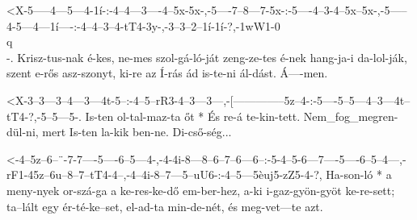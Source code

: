   {<X-5-----4---5---4-1í-:-4--4---3----4--5x-5x-,-5----7--8---7-5x-:-5----4--3-4--5x--5x-,-5-----4-5---4---1í----:-4--4--3--4-tT4-3y-,-3--3--2--1í-1í-?,-1wW1-0\\q\\-.}
  {   Krisz-tus-nak é-kes, ne-mes szol-gá-ló-ját  zeng-ze-tes é-nek  hang-ja-i da-lol-ják, szent e-rős asz-szonyt, ki-re az Í-rás ád   is-te-ni ál-dást. Á----men.}

  {<X-3--3---3--4---3---4t-5--:-4--5--rR3-4--3---3---,-[--------------5z--4-:-5----5--5---4--3---4t--tT4-?,-5--5---5-.}
  {   Is-ten ol-tal-maz-ta őt * És re-á   te-kin-tett. Nem_fog_megren-dül-ni, mert Is-ten la-kik ben-ne.    Di-cső-ség...}

  {<-4--5z--6--¨-7-7----5----6--5---4-,-4-4i-8---8--6--7--6---6--:-5-4--5-6---7----5----6--5--4---,-rF1-45z--6u--8--7--tT4-4--,-4--4i-8--7---5--uU6-:-4--5---5èuj5-zZ5-4-?,}
  {  Ha-son-ló * a meny-nyek or-szá-ga  a ke-res-ke-dő em-ber-hez, a-ki i-gaz-gyön-gyöt ke-re-sett; ta--lált egy ér-té-ke--set, el-ad-ta min-de-nét,  és meg-vet---te  azt.}